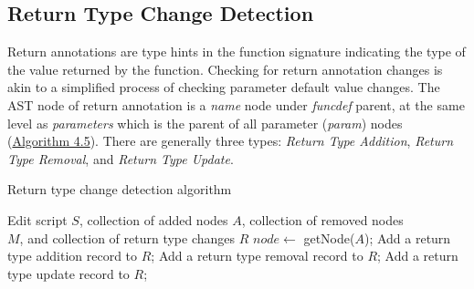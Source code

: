 \subsection{Return Type Change Detection}

Return annotations are type hints in the function signature indicating the type of the value returned by the function. Checking for return annotation changes is akin to a simplified process of checking parameter default value changes. The AST node of return annotation is a \textit{name} node under \textit{funcdef} parent, at the same level as \textit{parameters} which is the parent of all parameter (\textit{param}) nodes (\hyperref[algo:return-change-detect]{Algorithm 4.5}). There are generally three types: \textit{Return Type Addition}, \textit{Return Type Removal}, and \textit{Return Type Update}.

\begin{algorithm}
	\caption{Return type change detection algorithm}
	\label{algo:return-change-detect}
	\begin{algorithmic}[1]
		\REQUIRE Edit script $S$, collection of added nodes $A$, collection of removed nodes \\
		$M$, and collection of return type changes $R$
			\STATE $node \gets$ getNode($A$);
					\STATE Add a return type addition record to $R$;
					\STATE Add a return type removal record to $R$;
					\STATE Add a return type update record to $R$;
				\ENDIF
			\ENDIF
		\ENDFOR
	\end{algorithmic}
\end{algorithm}

